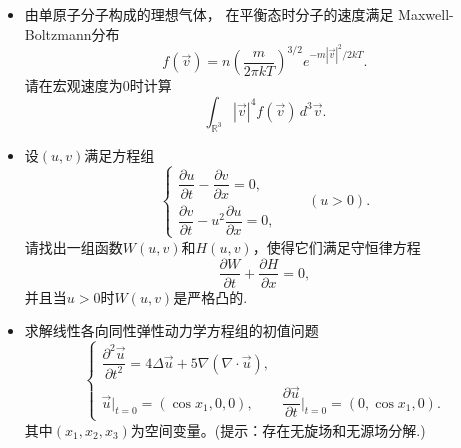 \begin{itemize}
    \item[六、]由单原子分子构成的理想气体，
    在平衡态时分子的速度满足
    Maxwell-Boltzmann分布
    \[
        f(\vec v)=n\left(\frac{m}{2\pi kT}\right)^{3/2}
        e^{-m|\vec v|^2/2kT}.
    \]
    请在宏观速度为$0$时计算
    \[
        \int_{\mathbb R^3}|\vec v|^4 f(\vec v)\,d^3\vec v.
    \]

    \item[七、]设$(u,v)$满足方程组
    \[
        \begin{cases}
            \dfrac{\partial u}{\partial t}-\dfrac{\partial v}{\partial x}=0,\\[0.6em]
            \dfrac{\partial v}{\partial t}-u^2\dfrac{\partial u}{\partial x}=0,
        \end{cases}
        \qquad (u>0).
    \]
    请找出一组函数$W(u,v)$和$H(u,v)$，使得它们满足守恒律方程
    \[
        \frac{\partial W}{\partial t}+\frac{\partial H}{\partial x}=0,
    \]
    并且当$u>0$时$W(u,v)$是严格凸的.

    \item[八、]求解线性各向同性弹性动力学方程组的初值问题
    \[
        \begin{cases}
            \dfrac{\partial^2\vec u}{\partial t^2}
            =4\Delta\vec u+5\nabla(\nabla\cdot\vec u),\\[0.6em]
            \vec u|_{t=0}=(\cos x_1,0,0),\qquad
            \dfrac{\partial\vec u}{\partial t}\bigg|_{t=0}
            =(0,\cos x_1,0).
        \end{cases}
    \]
    其中$(x_1,x_2,x_3)$为空间变量。(提示：存在无旋场和无源场分解.)
\end{itemize}